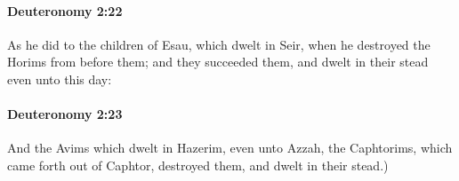 		\paragraph{Deuteronomy 2:22} %
			\label{DEUTERONOMY-2-22}

			As he did to the children of Esau, which dwelt in Seir, when he destroyed the Horims from before them; and they succeeded them, and dwelt in their stead even unto this day:


		\paragraph{Deuteronomy 2:23} %
			\label{DEUTERONOMY-2-23}

			And the Avims which dwelt in Hazerim, even unto Azzah, the Caphtorims, which came forth out of Caphtor, destroyed them, and dwelt in their stead.)


